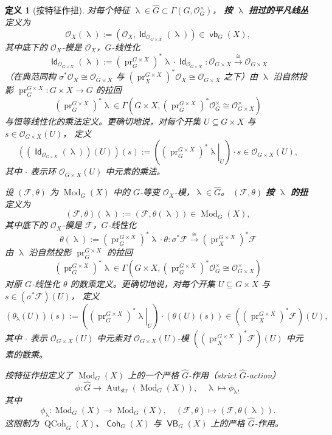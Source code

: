 \documentclass[11pt,a4paper]{article}
\renewcommand{\emph}[1]{{\bfseries #1}}
\DeclareMathOperator{\id}{\mathsf{Id}}
\DeclareMathOperator{\QCoh}{\mathrm{QCoh}}
\DeclareMathOperator{\Mod}{\mathrm{Mod}}
\DeclareMathOperator{\Coh}{\mathsf{Coh}}
\DeclareMathOperator{\Aut}{Aut}
\DeclareMathOperator{\VB}{\mathsf{VB}}
\DeclareMathOperator{\vb}{\mathsf{vb}}
\DeclareMathOperator{\str}{\operatorname{str}}
\DeclareMathOperator{\pr}{\operatorname{pr}}
\DeclareMathOperator{\cha}{\lambda}
\theoremstyle{cnth}
\newtheorem{defn}[thm]{定义}
\begin{document}
\begin{defn}[按特征作扭]
对每个特征
$\cha \in \widehat{G}\subset\Gamma\left(G, \mathcal{O}_G^\times\right)$，
\emph{按 $\cha$ 扭过的平凡线丛}定义为
$$
\mathcal{O}_X(\cha)
:=
(\mathcal{O}_X, \id_{\mathcal{O}_{G\times X}}(\cha))
\in \vb_G(X),
$$
其中底下的 $\mathcal{O}_X$-模是 $\mathcal{O}_X$，$G$-线性化
$$
\id_{\mathcal{O}_{G\times X}}(\cha)
:=
\left(\pr_G^{G \times X}\right)^* \cha \cdot \id_{\mathcal{O}_{G\times X}}
:
\mathcal{O}_{G\times X}
\xrightarrow{\cong}
\mathcal{O}_{G\times X}
$$
（在典范同构
$
\sigma^* \mathcal{O}_X
\cong
\mathcal{O}_{G\times X}
$
与
$
\left(\pr_X^{G \times X}\right)^* \mathcal{O}_X
\cong
\mathcal{O}_{G\times X}
$
之下）由 $\cha$ 沿自然投影
$\pr_G^{G\times X}:G\times X\rightarrow G$ 的拉回
$$
\left(\pr_G^{G \times X}\right)^* \cha
\in
\Gamma\left(G \times X, \left(\pr_G^{G\times X}\right)^*\mathcal{O}_G^\times \cong \mathcal{O}_{G \times X}^\times\right)
$$
与恒等线性化的乘法定义。更确切地说，对每个开集
$U\subseteq G\times X$
与
$s\in\mathcal{O}_{G\times X}(U)$，
定义
$$
\left(\left(\id_{\mathcal{O}_{G\times X}}(\cha)\right)(U)\right)(s)
:=
\left(\left.\left(\pr_G^{G \times X}\right)^* \cha\right|_U\right)
\cdot
s
\in
\mathcal{O}_{G\times X}(U),
$$
其中 $\cdot$ 表示环
$\mathcal{O}_{G\times X}(U)$ 中元素的乘法。

设 $(\mathcal{F}, \theta)$ 为 $\Mod_G(X)$ 中的 $G$-等变 $\mathcal{O}_X$-模，$\cha \in \widehat{G}$。
$(\mathcal{F},\theta)$ \emph{按 $\cha$ 的扭}定义为
$$
(\mathcal{F},\theta)(\cha)
:=
(\mathcal{F}, \theta(\cha))
\in \Mod_G(X),
$$
其中底下的 $\mathcal{O}_X$-模是 $\mathcal{F}$，$G$-线性化
$$
\theta(\cha)
:=
\left(\pr_G^{G \times X}\right)^* \cha \cdot \theta
:
\sigma^* \mathcal{F}
\xrightarrow{\cong}
\left(\pr_X^{G \times X}\right)^* \mathcal{F}
$$
由 $\cha$ 沿自然投影 $\pr_G^{G\times X}$ 的拉回
$$
\left(\pr_G^{G \times X}\right)^* \cha
\in
\Gamma\left(G \times X, \left(\pr_G^{G\times X}\right)^*\mathcal{O}_G^\times \cong \mathcal{O}_{G \times X}^\times\right)
$$
对原 $G$-线性化 $\theta$ 的数乘定义。更确切地说，对每个开集
$U\subseteq G\times X$
与
$s\in(\sigma^*\mathcal{F})(U)$，
定义
$$
(\theta_{\cha}(U))(s)
:=
\left(\left.\left(\pr_G^{G \times X}\right)^* \cha\right|_U\right)
\cdot
(\theta(U)(s))
\in
\left(\left(\pr_X^{G \times X}\right)^*\mathcal{F}\right)(U),
$$
其中 $\cdot$ 表示 $\mathcal{O}_{G\times X}(U)$ 中元素对 $\mathcal{O}_{G\times X}(U)$-模
$\left(\left(\pr_X^{G \times X}\right)^*\mathcal{F}\right)(U)$ 中元素的数乘。

按特征作扭定义了 $\Mod_G(X)$ 上的一个严格 $\widehat{G}$-作用（strict $\widehat{G}$-action）
$$
\phi:\widehat{G}\rightarrow\Aut_{\str}(\Mod_G(X)),
\quad
\cha\mapsto \phi_{\cha},
$$
其中
$$
\phi_{\cha}:\Mod_G(X)\rightarrow\Mod_G(X),
\quad
(\mathcal{F},\theta)
\mapsto
(\mathcal{F},\theta(\cha)).
$$
这限制为 $\QCoh_G(X)$、$\Coh_G(X)$ 与 $\VB_G(X)$ 上的严格 $\widehat{G}$-作用。
\end{defn}
\end{document}
